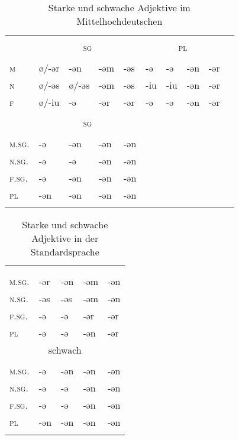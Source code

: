 \begin{table}[H]
	\caption{Starke und schwache Adjektive im Mittelhochdeutschen \citep[200-203]{Paul2007}}\label{table22}
	\begin{tabular}{>{\scshape}llllllllll}
		\lsptoprule
		\multicolumn{9}{c}{{stark}} \\
		& \multicolumn{4}{c}{\textsc{sg}} &  \multicolumn{4}{c}{\textsc{pl}} \\\cmidrule(lr){2-5}\cmidrule(lr){6-9}
		& \NOM & \AKK & \DAT & \GEN & \NOM & \AKK & \DAT & \GEN\\\midrule
		m & ø/-ər & {}-ən & {}-əm & {}-əs & {}-ə & {}-ə & {}-ən & {}-ər\\
		n & ø/-əs & ø/-əs & {}-əm & {}-əs & {}-iu & {}-iu & {}-ən & {}-ər\\
		f & ø/-iu & {}-ə & {}-ər & {}-ər & {}-ə & {}-ə & {}-ən & {}-ər\\\midrule
		\multicolumn{9}{c}{{schwach}}  \\
		& \multicolumn{4}{c}{\textsc{sg}}&  \\\cmidrule(lr){2-5}
		& \NOM & \AKK & \DAT & \GEN &  \\\midrule
		\textsc{m.sg.} & {}-ə & {}-ən & {}-ən & {}-ən &  &  &  & \\
		\textsc{n.sg.} & {}-ə & {}-ə & {}-ən & {}-ən &  &  &  & \\
		\textsc{f.sg.} & {}-ə & {}-ən & {}-ən & {}-ən &  &  &  & \\
		\textsc{pl} & {}-ən & {}-ən & {}-ən & {}-ən &  &  &  & \\
		\lspbottomrule
	\end{tabular}
\end{table}


\begin{table}[H]
	\caption{Starke und schwache Adjektive in der Standardsprache \citep[177-184]{Eisenberg2006}}\label{table23}
	\begin{tabular}{lllll}
		\lsptoprule
		\multicolumn{5}{c}{stark}\\
		& \NOM & \AKK & \DAT & \GEN\\\midrule
		\textsc{m.sg.} & {}-ər & {}-ən & {}-əm & {}-ən\\
		\textsc{n.sg.} & {}-əs & {}-əs & {}-əm & {}-ən\\
		\textsc{f.sg.} & {}-ə & {}-ə & {}-ər & {}-ər\\
		\textsc{pl} & {}-ə & {}-ə & {}-ən & {}-ər\\\midrule
		\multicolumn{5}{c}{schwach}\\
		& \NOM & \AKK & \DAT & \GEN\\\midrule
		\textsc{m.sg.} & {}-ə & {}-ən & {}-ən & {}-ən\\
		\textsc{n.sg.} & {}-ə & {}-ə & {}-ən & {}-ən\\
		\textsc{f.sg.} & {}-ə & {}-ə & {}-ən & {}-ən\\
		\textsc{pl} & {}-ən & {}-ən & {}-ən & {}-ən\\
		\lspbottomrule
	\end{tabular}
\end{table}

